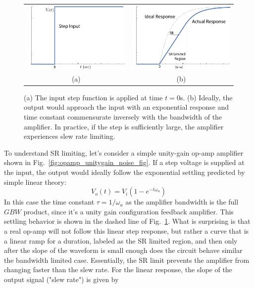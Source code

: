 \begin{figure}[tb]
\centering
\begin{tabular}{cc}
\includegraphics[width=.45\columnwidth]{step_input} &
\includegraphics[width=.45\columnwidth]{exp_slew}\\
(a) & (b)\\
\end{tabular}
\caption{(a) The input step function is applied at time $t=0$s.  (b) Ideally, the output would approach the input with an exponential response and time constant commensurate inversely with the bandwidth of the amplifier. In practice, if the step is sufficiently large, the amplifier experiences slew rate limiting.}
\label{fig:step_input}
\end{figure}
To understand SR limiting, let's consider a simple unity-gain op-amp amplifier shown in Fig.~\ref{fig:opamp_unitygain_noise_fig}.  If a step voltage is supplied at the input, the output would ideally  follow the exponential settling predicted by simple linear theory:
    \begin{equation}
        V_o(t) = V_i \left( 1 - e^{-t \omega_u} \right) 
    \end{equation}
In this case the time constant $\tau = 1/\omega_u$ as the amplifier bandwidth is the full $GBW$ product, since it's a unity gain configuration feedback amplifier.  This settling behavior is shown in the dashed line of Fig.~\ref{fig:step_input}.  What is surprising is that a real op-amp will not follow this linear step response, but rather a curve that is a linear ramp for a duration, labeled as the SR limited region, and then only after the slope of the waveform is small enough does the circuit behave similar the bandwidth limited case.  Essentially, the SR limit prevents the amplifier from changing faster than the slew rate.  For the linear response, the  slope of the output signal ("slew rate") is given by
